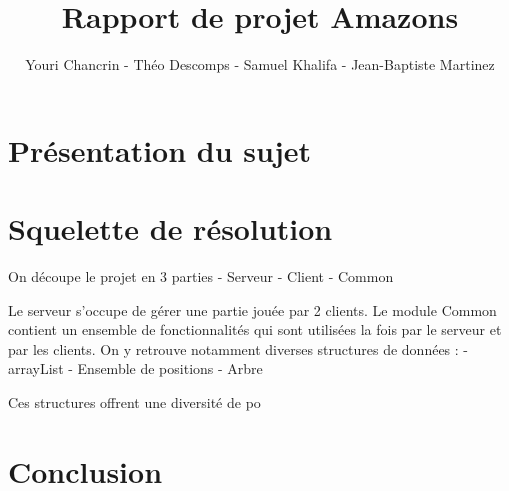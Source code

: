 \documentclass{article}
\author{Youri Chancrin - Théo Descomps - Samuel Khalifa - Jean-Baptiste Martinez}
\title{Rapport de projet Amazons}
\begin{document}
\maketitle

\section{Présentation du sujet}
\section{Squelette de résolution}
On découpe le projet en 3 parties
- Serveur
- Client
- Common

Le serveur s'occupe de gérer une partie jouée par 2 clients. 
Le module Common contient un ensemble de fonctionnalités qui sont 
utilisées la fois par le serveur et par les clients. On y retrouve 
notamment diverses structures de données :
- arrayList
- Ensemble de positions
- Arbre

Ces structures offrent une diversité de po

\section{}
\section{Conclusion}
\end{document}
